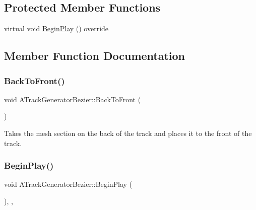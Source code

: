 \subsection*{Protected Member Functions}
\begin{DoxyCompactItemize}
\item 
virtual void \mbox{\hyperlink{class_a_track_generator_bezier_a79c2361e336c86302c2c895ed05022d4}{Begin\+Play}} () override
\end{DoxyCompactItemize}


\subsection{Member Function Documentation}
\mbox{\label{class_a_track_generator_bezier_a39d9dbc7a7a0d30ce12f5c2d46e8cd6f}} 
\subsubsection{\texorpdfstring{BackToFront()}{BackToFront()}}
{\footnotesize\ttfamily void A\+Track\+Generator\+Bezier\+::\+Back\+To\+Front (\begin{DoxyParamCaption}{ }\end{DoxyParamCaption})}



Takes the mesh section on the back of the track and places it to the front of the track. 

\mbox{\label{class_a_track_generator_bezier_a79c2361e336c86302c2c895ed05022d4}} 
\subsubsection{\texorpdfstring{BeginPlay()}{BeginPlay()}}
{\footnotesize\ttfamily void A\+Track\+Generator\+Bezier\+::\+Begin\+Play (\begin{DoxyParamCaption}{ }\end{DoxyParamCaption})\hspace{0.3cm}{\ttfamily [override]}, {\ttfamily [protected]}, {\ttfamily [virtual]}}

